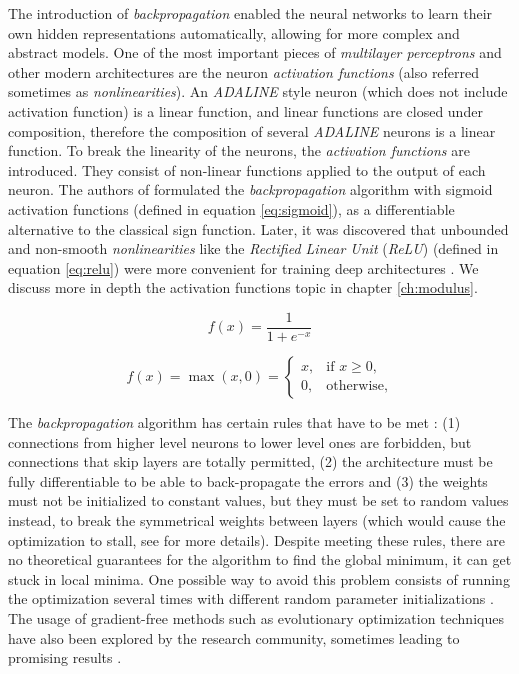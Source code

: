 The introduction of \textit{backpropagation} enabled the neural networks to learn their own hidden representations automatically, allowing for more complex and abstract models. One of the most important pieces of \textit{multilayer perceptrons} and other modern architectures are the neuron \textit{activation functions} (also referred sometimes as \textit{nonlinearities}). An \textit{ADALINE} style neuron (which does not include activation function) is a linear function, and linear functions are closed under composition, therefore the composition of several \textit{ADALINE} neurons is a linear function. To break the linearity of the neurons, the \textit{activation functions} are introduced. They consist of non-linear functions applied to the output of each neuron. The authors of \autocite{hinton1986} formulated the \textit{backpropagation} algorithm with sigmoid activation functions (defined in equation \ref{eq:sigmoid}), as a differentiable alternative to the classical sign function. Later, it was discovered that unbounded and non-smooth \textit{nonlinearities} like the \textit{Rectified Linear Unit} (\textit{ReLU}) \autocite{nair2010} (defined in equation \ref{eq:relu}) were more convenient for training deep architectures \autocite{Goodfellow2016}. We discuss more in depth the activation functions topic in chapter \ref{ch:modulus}.


\begin{equation}
\label{eq:sigmoid}
f(x) = \frac{1}{1+e^{-x}}
\end{equation}

\begin{equation}
\label{eq:relu}
f(x) = \max(x, 0) =
\begin{cases}
x,          & \text{if } x \geq 0 ,\\
0,         & \text{otherwise},
\end{cases}
\end{equation}

The \textit{backpropagation} algorithm has certain rules that have to be met \autocite{hinton1986}: (1) connections from higher level neurons to lower level ones are forbidden, but connections that skip layers are totally permitted, (2) the architecture must be fully differentiable to be able to back-propagate the errors and (3) the weights must not be initialized to constant values, but they must be set to random values instead, to break the symmetrical weights between layers (which would cause the optimization to stall, see \autocite{hinton1986} for more details). Despite meeting these rules, there are no theoretical guarantees for the algorithm to find the global minimum, it can get stuck in local minima. One possible way to avoid this problem consists of running the optimization several times with different random parameter initializations \autocite{haykin1998}. The usage of gradient-free methods such as evolutionary optimization techniques \autocite{sivanandam2008} have also been explored by the research community, sometimes leading to promising results \autocite{omid2014, vallesperez2012}.

